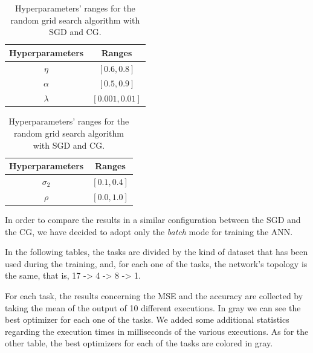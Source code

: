         \begin{table}[H]
          \centering
          \caption{Hyperparameters' ranges for the random grid search algorithm with SGD and CG.}
          \begin{minipage}{.4\textwidth}
              \centering
              \begin{tabular}{| c | c |}
                    \hline
                    Hyperparameters & Ranges\\
                    \hline
                    $\eta$ & $\left [0.6, 0.8 \right ]$ \\
                    \hline
                    $\alpha$ & $[0.5, 0.9]$ \\
                    \hline
                    $\lambda$ & $[0.001, 0.01]$ \\
                    \hline
              \end{tabular}
          \end{minipage}
          \begin{minipage}{.4\textwidth}
              \centering
              \begin{tabular}{| c | c |}
                    \hline
                    Hyperparameters & Ranges\\
                    \hline
                    $\sigma_2$ & $\left [0.1, 0.4 \right ]$ \\
                    \hline
                    $\rho$ & $[0.0, 1.0]$ \\
                    \hline
              \end{tabular}
            \end{minipage}
            \label{tab:hyper_monk}
        \end{table}

        In order to compare the
        results in a similar configuration between the SGD and the CG, we have decided to adopt only the \textit{batch} mode for training the ANN.

        In the following tables, the tasks are divided by the kind of dataset that has been used during the training, and, for
        each one of the tasks, the network's topology is the same, that is, 17 -> 4 -> 8 -> 1.

        For each
        task, the results concerning the MSE and the accuracy are collected by taking the mean of the
        output of 10 different executions. In gray we can see the best optimizer for each one of the
        tasks. We added some additional statistics
        regarding the execution times in milliseconds of the various executions. As for the other table, the best
        optimizers for each of the tasks are colored in gray.


